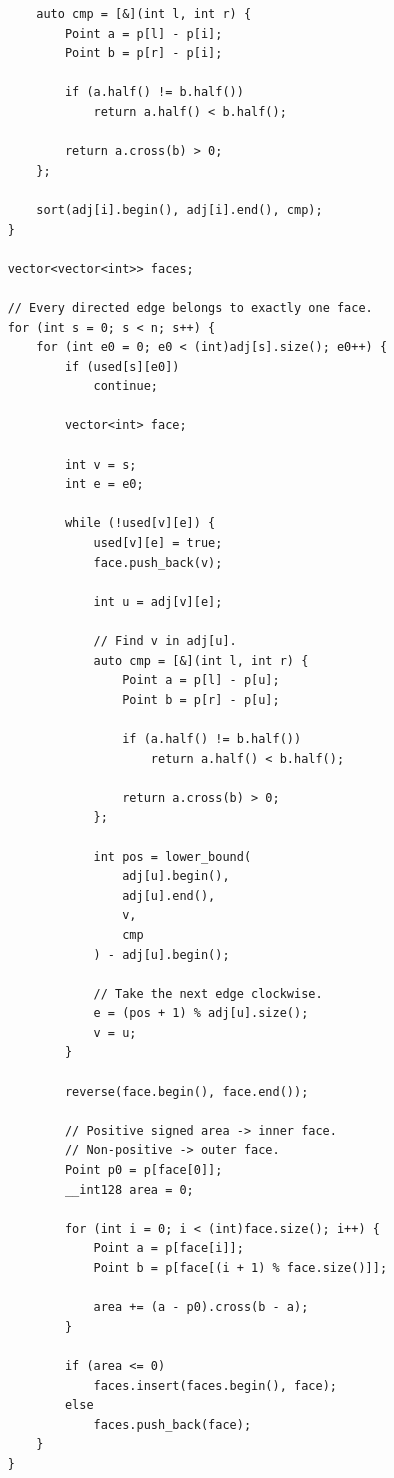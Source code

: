 \documentclass[8pt,a4paper,landscape]{article}
\begin{document}
\begin{multicols}{3}
\begin{lstlisting}
        auto cmp = [&](int l, int r) {
            Point a = p[l] - p[i];
            Point b = p[r] - p[i];

            if (a.half() != b.half())
                return a.half() < b.half();

            return a.cross(b) > 0;
        };

        sort(adj[i].begin(), adj[i].end(), cmp);
    }

    vector<vector<int>> faces;

    // Every directed edge belongs to exactly one face.
    for (int s = 0; s < n; s++) {
        for (int e0 = 0; e0 < (int)adj[s].size(); e0++) {
            if (used[s][e0])
                continue;

            vector<int> face;

            int v = s;
            int e = e0;

            while (!used[v][e]) {
                used[v][e] = true;
                face.push_back(v);

                int u = adj[v][e];

                // Find v in adj[u].
                auto cmp = [&](int l, int r) {
                    Point a = p[l] - p[u];
                    Point b = p[r] - p[u];

                    if (a.half() != b.half())
                        return a.half() < b.half();

                    return a.cross(b) > 0;
                };

                int pos = lower_bound(
                    adj[u].begin(),
                    adj[u].end(),
                    v,
                    cmp
                ) - adj[u].begin();

                // Take the next edge clockwise.
                e = (pos + 1) % adj[u].size();
                v = u;
            }

            reverse(face.begin(), face.end());

            // Positive signed area -> inner face.
            // Non-positive -> outer face.
            Point p0 = p[face[0]];
            __int128 area = 0;

            for (int i = 0; i < (int)face.size(); i++) {
                Point a = p[face[i]];
                Point b = p[face[(i + 1) % face.size()]];

                area += (a - p0).cross(b - a);
            }

            if (area <= 0)
                faces.insert(faces.begin(), face);
            else
                faces.push_back(face);
        }
    }


\end{lstlisting}
\end{multicols}
\end{document}
